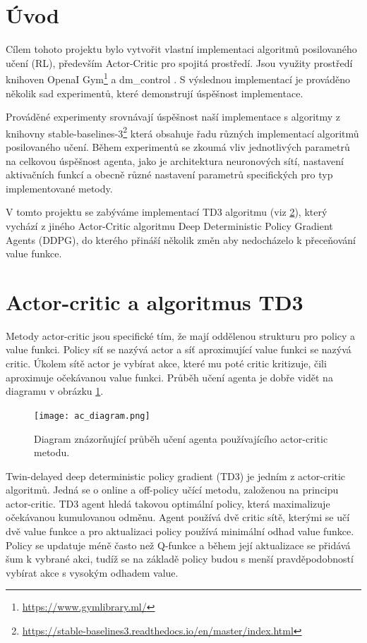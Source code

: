 \section{Úvod}

Cílem tohoto projektu bylo vytvořit vlastní implementaci algoritmů posilovaného učení (RL), především Actor-Critic pro spojitá prostředí. Jsou využity prostředí knihoven OpenaI Gym\footnote{\url{https://www.gymlibrary.ml/}} a dm\_control \cite{tunyasuvunakool2020}. S výslednou implementací je prováděno několik sad experimentů, které demonstrují úspěšnost implementace.

Prováděné experimenty srovnávají úspěšnost naší implementace s algoritmy z knihovny stable-baselines-3\footnote{\url{https://stable-baselines3.readthedocs.io/en/master/index.html}} která obsahuje řadu různých implementací algoritmů posilovaného učení. Během experimentů se zkoumá vliv jednotlivých parametrů na celkovou úspěšnost agenta, jako je architektura neuronových sítí, nastavení aktivačních funkcí a obecně různé nastavení parametrů specifických pro typ implementované metody. 

V tomto projektu se zabýváme implementací TD3 algoritmu (viz \ref{sec:TD3}), který vychází z jiného Actor-Critic algoritmu Deep Deterministic Policy Gradient Agents (DDPG), do kterého přináší několik změn aby nedocházelo k přeceňování value funkce.

\section{Actor-critic a algoritmus TD3}
\label{sec:TD3}
Metody actor-critic jsou specifické tím, že mají oddělenou strukturu pro policy a value funkci. Policy síť se nazývá actor a síť aproximující value funkci se nazývá critic. Úkolem sítě actor je vybírat akce, které mu poté critic kritizuje, čili aproximuje očekávanou value funkci. Průběh učení agenta je dobře vidět na diagramu v obrázku \ref{fig:ac_diagram}.

\begin{figure}[t]
	\centering
	\texttt{[image: ac\_diagram.png]}
	\caption{Diagram znázorňující průběh učení agenta používajícího actor-critic metodu.}
	\label{fig:ac_diagram}
\end{figure}

Twin-delayed deep deterministic policy gradient (TD3) je jedním z actor-critic algoritmů. Jedná se o online a off-policy učící metodu, založenou na principu actor-critic. TD3 agent hledá takovou optimální policy, která maximalizuje očekávanou kumulovanou odměnu. Agent používá dvě critic sítě, kterými se učí dvě value funkce a pro aktualizaci policy používá minimální odhad value funkce. Policy se updatuje méně často než Q-funkce a během její aktualizace se přidává šum k vybrané akci, tudíž se na základě policy budou s menší pravděpodobností vybírat akce s vysokým odhadem value.
\cite{TD3MathWorks}
